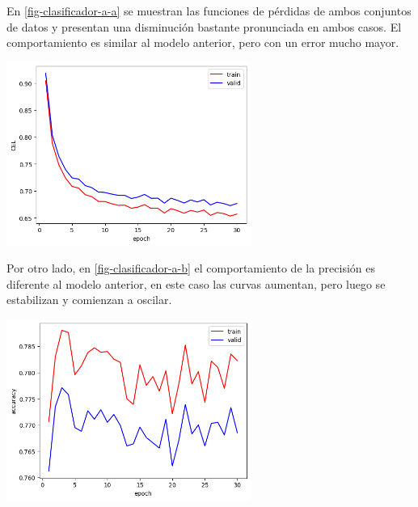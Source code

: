 \documentclass[aps,prl,reprint,groupedaddress]{revtex4-2}
\newenvironment{Figura}
  {\par\medskip\noindent\minipage{\linewidth}}
  {\endminipage\par\medskip}
\begin{document}
En \ref{fig-clasificador-a-a} se muestran las funciones de pérdidas de ambos 
conjuntos de datos y presentan una disminución bastante pronunciada en ambos casos. 
El comportamiento es similar al modelo anterior, pero con un error mucho mayor.
\begin{Figura}
  \centering
  \includegraphics[width=0.60\textwidth]{figs1/modelo_original_entrenando_solo_clasificadora_a.png}
  \label{fig-clasificador-a-a}
\end{Figura}

Por otro lado, en \ref{fig-clasificador-a-b} el comportamiento de la precisión 
es diferente al modelo anterior, en este caso las curvas aumentan, pero luego se
estabilizan y comienzan a oscilar.
\begin{Figura}
  \centering
  \includegraphics[width=0.60\textwidth]{figs1/modelo_original_entrenando_solo_clasificadora_b.png}
  \label{fig-clasificador-a-b}
\end{Figura}
\end{document}
